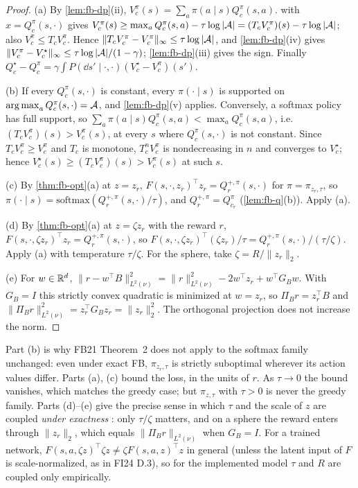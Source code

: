 \begin{proof}
(a) By \cref{lem:fb-dp}(ii), $V^\pi_c(s)=\sum_a\pi(a\mid s)Q^\pi_c(s,a)$.
 with $x=Q^\pi_c(s,\cdot)$ gives $V^\pi_c(s)\ge\max_aQ^\pi_c(s,a)-\tau\log|\mathcal{A}|=(T_cV^\pi_c)(s)-\tau\log|\mathcal{A}|$; also $V^\pi_c\le T_cV^\pi_c$.
Hence $\|T_cV^\pi_c-V^\pi_c\|_\infty\le\tau\log|\mathcal{A}|$, and \cref{lem:fb-dp}(iv) gives $\|V^\pi_c-V^\star_c\|_\infty\le\tau\log|\mathcal{A}|/(1-\gamma)$; \cref{lem:fb-dp}(iii) gives the sign.
Finally $Q^\star_c-Q^\pi_c=\gamma\int P(\dd s'\mid\cdot,\cdot)(V^\star_c-V^\pi_c)(s')$.

(b) If every $Q^\pi_c(s,\cdot)$ is constant, every $\pi(\cdot\mid s)$ is supported on $\operatorname*{arg\,max}_aQ^\pi_c(s,\cdot)=\mathcal{A}$, and \cref{lem:fb-dp}(v) applies.
Conversely, a softmax policy has full support, so $\sum_a\pi(a\mid s)Q^\pi_c(s,a)<\max_aQ^\pi_c(s,a)$, i.e.\ $(T_cV^\pi_c)(s)>V^\pi_c(s)$, at every $s$ where $Q^\pi_c(s,\cdot)$ is not constant.
Since $T_cV^\pi_c\ge V^\pi_c$ and $T_c$ is monotone, $T_c^nV^\pi_c$ is nondecreasing in $n$ and converges to $V^\star_c$; hence $V^\star_c(s)\ge(T_cV^\pi_c)(s)>V^\pi_c(s)$ at such $s$.

(c) By \cref{thm:fb-opt}(a) at $z=z_r$, $F(s,\cdot,z_r)^\top z_r=Q^{+,\pi}_r(s,\cdot)$ for $\pi=\pi_{z_r,\tau}$, so $\pi(\cdot\mid s)=\mathrm{softmax}(Q^{+,\pi}_r(s,\cdot)/\tau)$, and $Q^{+,\pi}_r=Q^\pi_{c_r}$ (\cref{lem:fb-q}(b)). Apply (a).

(d) By \cref{thm:fb-opt}(a) at $z=\zeta z_r$ with the reward $r$, $F(s,\cdot,\zeta z_r)^\top z_r=Q^{+,\pi}_r(s,\cdot)$, so $F(s,\cdot,\zeta z_r)^\top(\zeta z_r)/\tau=Q^{+,\pi}_r(s,\cdot)/(\tau/\zeta)$. Apply (a) with temperature $\tau/\zeta$. For the sphere, take $\zeta=R/\|z_r\|_2$.

(e) For $w\in\mathbb{R}^d$, $\|r-w^\top B\|^2_{L^2(\nu)}=\|r\|^2_{L^2(\nu)}-2w^\top z_r+w^\top G_Bw$. With $G_B=I$ this strictly convex quadratic is minimized at $w=z_r$, so $\Pi_Br=z_r^\top B$ and $\|\Pi_Br\|^2_{L^2(\nu)}=z_r^\top G_Bz_r=\|z_r\|_2^2$.
The orthogonal projection does not increase the norm.
\end{proof}

\begin{remark}
Part (b) is why FB21 Theorem~2 does not apply to the softmax family unchanged: even under exact FB, $\pi_{z_r,\tau}$ is strictly suboptimal wherever its action values differ.
Parts (a), (c) bound the loss, in the units of $r$. As $\tau\to0$ the bound vanishes, which matches the greedy case; but $\pi_{z,\tau}$ with $\tau>0$ is never the greedy family.
Parts (d)--(e) give the precise sense in which $\tau$ and the scale of $z$ are coupled \emph{under exactness} : only $\tau/\zeta$ matters, and on a sphere the reward enters through $\|z_r\|_2$, which equals $\|\Pi_Br\|_{L^2(\nu)}$ when $G_B=I$.
For a trained network, $F(s,a,\zeta z)^\top\zeta z\ne\zeta F(s,a,z)^\top z$ in general (unless the latent input of $F$ is scale-normalized, as in FI24 D.3), so for the implemented model $\tau$ and $R$ are coupled only empirically.
\end{remark}


